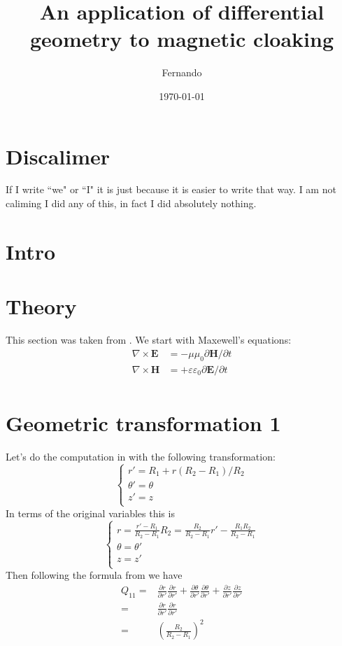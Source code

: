 \documentclass{amsart}
\begin{document}
\newcommand{\R}{\mathbb{R}}

\title{An application of differential geometry to magnetic cloaking}
\author{Fernando}
\date{\today}
\maketitle

\section{Discalimer}
If I write ``we" or ``I" it is just
because it is easier to write that way. I am not caliming
I did any of this, in fact I did absolutely nothing.
\section{Intro}
\blindtext[1]
\section{Theory}
This section was taken from \cite{ward96}.
We start with Maxewell's equations:
\begin{align*}
  \nabla \times \textbf{E} &= -\mu \mu_0 \partial \textbf{H} /\partial t\\
  \nabla \times \textbf{H} &= +\varepsilon \varepsilon_0 \partial \textbf{E} /\partial t\\
\end{align*}

\section{Geometric transformation 1}
Let's do the computation in \cite{ward96} with the following transformation:
\[\begin{cases}
r'=R_1+r(R_2-R_1)/R_2\\
\theta'=\theta\\
z'=z\\
\end{cases}\]
In terms of the original variables this is
\[\begin{cases}
r=\frac{r'-R_1}{R_2-R_1}R_2=\frac{R_2}{R_2-R_1}r'-\frac{R_1R_2}{R_2-R_1}\\
\theta=\theta'\\
z=z'\\
\end{cases}\]
Then following the formula from \cite{ward96} we have
\begin{align*}
Q_{11}
=&\frac{\partial r}{\partial r'}\frac{\partial r}{\partial r'}
+\frac{\partial \theta}{\partial r'}\frac{\partial \theta}{\partial r'}
+\frac{\partial z}{\partial r'}\frac{\partial z}{\partial r'}\\
=&\frac{\partial r}{\partial r'}\frac{\partial r}{\partial r'}\\
=&\left(\frac{R_2}{R_2-R_1}\right)^2
\end{align*}
\end{document}
